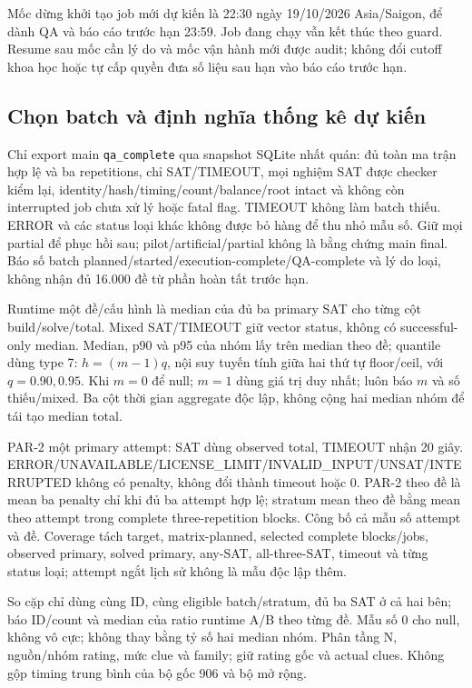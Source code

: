 Mốc dừng khởi tạo job mới dự kiến là 22:30 ngày 19/10/2026 Asia/Saigon,
để dành QA và báo cáo trước hạn 23:59. Job đang chạy vẫn kết thúc theo guard.
Resume sau mốc cần lý do và mốc vận hành mới được audit; không đổi cutoff
khoa học hoặc tự cấp quyền đưa số liệu sau hạn vào báo cáo trước hạn.

\subsection{Chọn batch và định nghĩa thống kê dự kiến}
Chỉ export main \texttt{qa\_complete} qua snapshot SQLite nhất quán:
đủ toàn ma trận hợp lệ và ba repetitions, chỉ SAT/TIMEOUT, mọi nghiệm SAT
được checker kiểm lại, identity/hash/timing/count/balance/root intact và không
còn interrupted job chưa xử lý hoặc fatal flag. TIMEOUT không làm batch thiếu.
ERROR và các status loại khác không được bỏ hàng để thu nhỏ mẫu số.
Giữ mọi partial để phục hồi sau; pilot/artificial/partial không là bằng chứng
main final. Báo số batch planned/started/execution-complete/QA-complete và lý do
loại, không nhận đủ 16.000 đề từ phần hoàn tất trước hạn.

Runtime một đề/cấu hình là median của đủ ba primary SAT cho từng cột
build/solve/total. Mixed SAT/TIMEOUT giữ vector status, không có successful-only
median. Median, p90 và p95 của nhóm lấy trên median theo đề; quantile dùng
type 7: $h=(m-1)q$, nội suy tuyến tính giữa hai thứ tự floor/ceil, với
$q=0.90,0.95$. Khi $m=0$ để null; $m=1$ dùng giá trị duy nhất; luôn báo $m$
và số thiếu/mixed. Ba cột thời gian aggregate độc lập, không cộng hai median
nhóm để tái tạo median total.

PAR-2 một primary attempt: SAT dùng observed total, TIMEOUT nhận 20 giây.
ERROR/UNAVAILABLE/LICENSE\_LIMIT/INVALID\_INPUT/UNSAT/INTERRUPTED không có
penalty, không đổi thành timeout hoặc 0. PAR-2 theo đề là mean ba penalty
chỉ khi đủ ba attempt hợp lệ; stratum mean theo đề bằng mean theo attempt
trong complete three-repetition blocks. Công bố cả mẫu số attempt và đề.
Coverage tách target, matrix-planned, selected complete blocks/jobs,
observed primary, solved primary, any-SAT, all-three-SAT, timeout và từng
status loại; attempt ngắt lịch sử không là mẫu độc lập thêm.

So cặp chỉ dùng cùng ID, cùng eligible batch/stratum, đủ ba SAT ở cả hai bên;
báo ID/count và median của ratio runtime A/B theo từng đề. Mẫu số 0 cho null,
không vô cực; không thay bằng tỷ số hai median nhóm. Phân tầng N, nguồn/nhóm
rating, mức clue và family; giữ rating gốc và actual clues.
Không gộp timing trung bình của bộ gốc 906 và bộ mở rộng.

